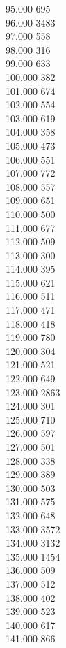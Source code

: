 { 95.000	695 \\
 96.000	3483 \\
 97.000	558 \\
 98.000	316 \\
 99.000	633 \\
 100.000	382 \\
 101.000	674 \\
 102.000	554 \\
 103.000	619 \\
 104.000	358 \\
 105.000	473 \\
 106.000	551 \\
 107.000	772 \\
 108.000	557 \\
 109.000	651 \\
 110.000	500 \\
 111.000	677 \\
 112.000	509 \\
 113.000	300 \\
 114.000	395 \\
 115.000	621 \\
 116.000	511 \\
 117.000	471 \\
 118.000	418 \\
 119.000	780 \\
 120.000	304 \\
 121.000	521 \\
 122.000	649 \\
 123.000	2863 \\
 124.000	301 \\
 125.000	710 \\
 126.000	597 \\
 127.000	501 \\
 128.000	338 \\
 129.000	389 \\
 130.000	503 \\
 131.000	575 \\
 132.000	648 \\
 133.000	3572 \\
 134.000	3132 \\
 135.000	1454 \\
 136.000	509 \\
 137.000	512 \\
 138.000	402 \\
 139.000	523 \\
 140.000	617 \\
 141.000	866 \\
}
